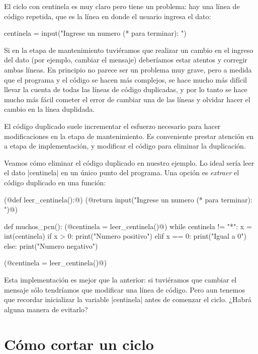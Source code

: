El ciclo con centinela es muy claro pero tiene un problema: hay una línea de
código repetida, que es la línea en donde el usuario ingresa el dato:

\begin{codigo-python-sn}
centinela = input("Ingrese un numero (* para terminar): ")
\end{codigo-python-sn}

Si en la etapa de mantenimiento tuviéramos que realizar un
cambio en el ingreso del dato (por ejemplo, cambiar el mensaje) deberíamos
estar atentos y corregir ambas líneas. En principio no parece ser un problema
muy grave, pero a medida que el programa y el código se hacen más complejos,
se hace mucho más difícil llevar la cuenta de todas las líneas de código
duplicadas, y por lo tanto se hace mucho más fácil cometer el error de cambiar
una de las líneas y olvidar hacer el cambio en la línea duplidada.

\begin{observacion}
El código duplicado suele incrementar el esfuerzo necesario para hacer
modificaciones en la etapa de mantenimiento. Es conveniente prestar atención en
a etapa de implementación, y modificar el código para eliminar la duplicación.
\end{observacion}

Veamos cómo eliminar el código duplicado en nuestro ejemplo.
Lo ideal sería leer el dato |centinela| en un único punto del
programa. Una opción es \emph{extraer} el código duplicado en una función:

\begin{codigo-python-sn}
(@def leer_centinela():@)
    (@return input("Ingrese un numero (* para terminar): ")@)

def muchos_pcn():
    (@centinela = leer_centinela()@)
    while centinela != "*":
        x = int(centinela)
        if x > 0:
            print("Numero positivo")
        elif x == 0:
            print("Igual a 0")
        else:
            print("Numero negativo")

        (@centinela = leer_centinela()@)
\end{codigo-python-sn}

Esta implementación es mejor que la anterior: si tuviéramos que cambiar el
mensaje sólo tendríamos que modificar una línea de código. Pero aun tenemos que
recordar inicializar la variable |centinela| antes de comenzar el ciclo. ¿Habrá
alguna manera de evitarlo?

\section{Cómo cortar un ciclo}

